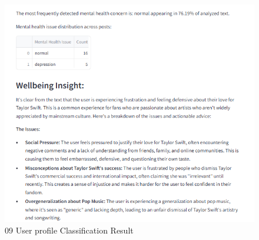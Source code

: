 \begin{figure}[h!]  
    \centering
    \includegraphics[width=1.0\textwidth]{App Images/09 Interface.png}  
    \caption{09 User profile Classification Result}
    \label{09i}  %
\end{figure}

